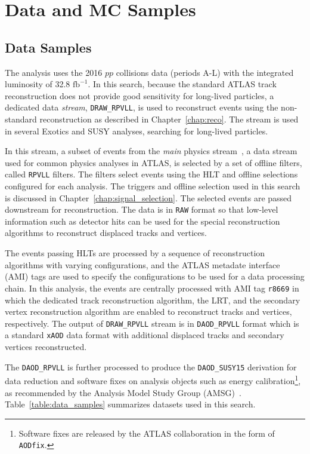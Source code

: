 \chapter{Data and MC Samples}
\label{chap:data_mc}

\section{Data Samples}
\label{sec:data_mc:data}

The analysis uses the 2016 $pp$ collisions data (periods A-L) with the integrated luminosity of 32.8 $\mathrm{fb^{-1}}$. In this search, because the standard ATLAS track reconstruction does not provide good sensitivity for long-lived particles, a dedicated data \textit{stream}, \texttt{DRAW\_RPVLL}, is used to reconstruct events using the non-standard reconstruction as described in Chapter~\ref{chap:reco}. The stream is used in several Exotics and SUSY analyses, searching for long-lived particles. %

In this stream, a subset of events from the \textit{main} physics stream~\cite{Aaboud:2016leb}, a data stream used for common physics analyses in ATLAS, is selected by a set of offline filters, called \texttt{RPVLL} filters. The filters select events using the HLT and offline selections configured for each analysis. The triggers and offline selection used in this search is discussed in Chapter~\ref{chap:signal_selection}. The selected events are passed downstream for reconstruction. The data is in \texttt{RAW} format so that low-level information such as detector hits can be used for the special reconstruction algorithms to reconstruct displaced tracks and vertices.

The events passing HLTs are processed by a sequence of reconstruction algorithms with varying configurations, and the ATLAS metadate interface (AMI) tags are used to specify the configurations to be used for a data processing chain. In this analysis, the events are centrally processed with AMI tag \texttt{r8669} in which the dedicated track reconstruction algorithm, the LRT, and the secondary vertex reconstruction algorithm are enabled to reconstruct tracks and vertices, respectively. The output of \texttt{DRAW\_RPVLL} stream is in \texttt{DAOD\_RPVLL} format which is a standard \texttt{xAOD} data format with additional displaced tracks and secondary vertices reconstructed. 

The \texttt{DAOD\_RPVLL} is further processed to produce the \texttt{DAOD\_SUSY15} derivation for data reduction and software fixes on analysis objects such as energy calibration\footnote{Software fixes are released by the ATLAS collaboration in the form of \texttt{AODfix}.}, as recommended by the Analysis Model Study Group (AMSG)~\cite{Catmore:1543445}. Table~\ref{table:data_samples} summarizes datasets used in this search.

